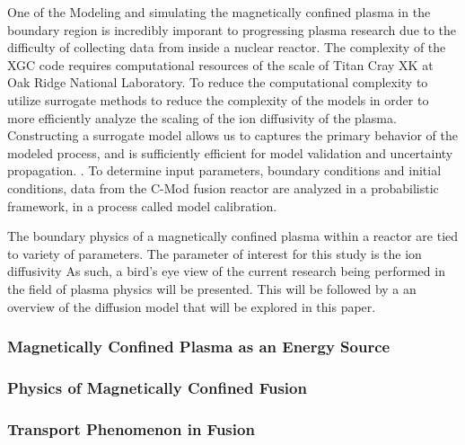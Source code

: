 \documentclass{article}
\begin{document}
One of the Modeling and simulating the magnetically confined plasma in the boundary region is incredibly imporant to progressing plasma research due to the difficulty of collecting data from inside a nuclear reactor.\cite{Smith_UQ:3} The complexity of the  XGC code requires computational resources of the scale of Titan Cray XK at Oak Ridge National Laboratory. To reduce the computational complexity  to utilize surrogate methods to reduce the complexity of the models in order to more efficiently analyze the scaling of the ion diffusivity of the plasma. Constructing a surrogate model allows us to captures the primary behavior of the modeled process, and is sufficiently efficient for model validation and uncertainty propagation.  \cite{Smith_UQ:3}. To determine input parameters, boundary conditions and initial conditions, data from the C-Mod fusion reactor are analyzed in a probabilistic framework, in a process called model calibration. 

 \cite{PPPL_P:2}
The boundary physics of a magnetically confined plasma within a reactor are tied to variety of parameters. The parameter of interest for this study is the ion diffusivity 
As such, a bird's eye view of the current research being performed in the field of plasma physics will be presented. \cite{J_Friedberg:1}
This will be followed by a an overview of the diffusion model that will be explored in this paper.\\
\subsubsection{Magnetically Confined Plasma as an Energy Source}
\subsubsection{Physics of Magnetically Confined Fusion}
\subsubsection{Transport Phenomenon in Fusion}
\end{document}
